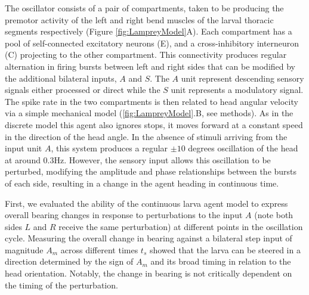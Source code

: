\documentclass[11pt,a4paper]{article}
\newcommand{\todoBW}[1]{\todo[author=BW,color=orange, size=\tiny,inline]{1}}
\begin{document}
The oscillator consists of a pair of compartments, taken to be producing the premotor activity of the left and right bend muscles of the larval thoracic  segments respectively (Figure \ref{fig:LampreyModel}A). Each compartment has a pool of self-connected excitatory neurons (E), and a cross-inhibitory interneuron (C) projecting to the other compartment. This connectivity produces regular alternation in firing bursts between left and right sides that can be modified by the additional bilateral inputs, $A$ and $S$. The $A$ unit represent descending sensory signals either processed or direct while the $S$ unit represents a modulatory signal.
 The spike rate in the two compartments is then related to head angular velocity via a simple mechanical model (\ref{fig:LampreyModel}.B, see methods). As in the discrete model this agent also ignores stops, it moves forward at a constant speed in the direction of the head angle. In the absence of stimuli arriving from the input unit $A$, this system produces a regular $\pm 10$ degrees oscillation of the head at around 0.3Hz. However, the sensory input allows this oscillation to be perturbed, modifying  the amplitude and phase relationships between the bursts of each side, resulting in a change in the agent heading in continuous time.



First, we evaluated the ability of the continuous larva agent model to express overall bearing changes in response to perturbations to the input $A$ (note both sides $L$ and $R$ receive the same perturbation) at different points in the oscillation cycle. Measuring the overall change in bearing against a bilateral step input of magnitude $A_m$ across different times $t_s$ showed that the larva can be steered in a direction determined by the sign of $A_m$ and its broad timing in relation to the head orientation.
Notably, the change in bearing is not critically dependent on the timing of the perturbation. 

\end{document}
